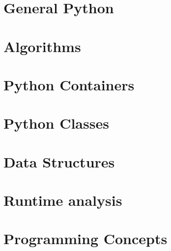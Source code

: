 \documentclass[numerate]{cheatsheet}
\author{Julian Lotzer – jlotzer@student.ethz.ch\\ 
Daniel Steinhauser – dsteinhauser@student.ethz.ch\\
Modified by:
Christian Leser - cleser@ethz.ch
\\ \vspace*{-0.2em}}
\begin{document}
\section{General Python} %
	
    
    
    
    

\section{Algorithms} %
    
    

\section{Python Containers} %
    
    
    

\section{Python Classes} %
    
    
    
    

\section{Data Structures} %
    
    
    
    
    
    

\section{Runtime analysis} %
    
    

\section{Programming Concepts} %
    
    
    
    
\end{document}

